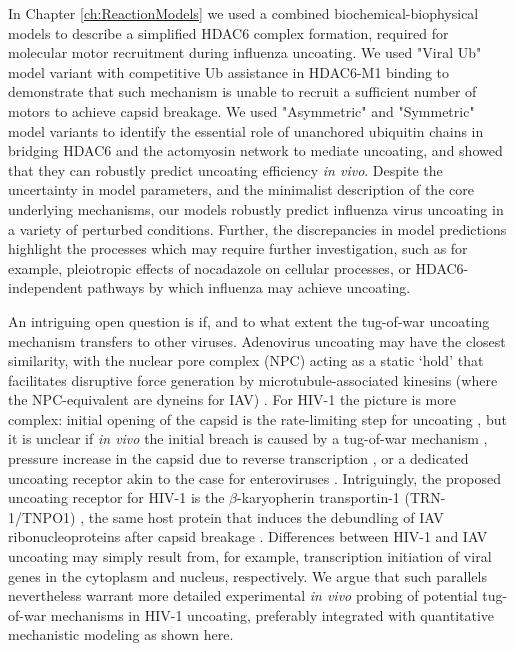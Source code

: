 In Chapter \ref{ch:ReactionModels} we used a combined biochemical-biophysical models to describe a simplified HDAC6 complex formation, required for molecular motor recruitment during influenza uncoating. We used "Viral Ub" model variant with competitive Ub assistance in HDAC6-M1 binding to demonstrate that such mechanism is unable to recruit a sufficient number of motors to achieve capsid breakage. We used "Asymmetric" and "Symmetric" model variants to identify the essential role of unanchored ubiquitin chains in bridging HDAC6 and the actomyosin network to mediate uncoating, and showed that they can robustly predict uncoating efficiency \textit{in vivo}. Despite the uncertainty in model parameters, and the minimalist description of the core underlying mechanisms, our models robustly predict influenza virus uncoating in a variety of perturbed conditions. Further, the discrepancies in model predictions highlight the processes which may require further investigation, such as for example, pleiotropic effects of nocadazole on cellular processes, or HDAC6-independent pathways by which influenza may achieve uncoating. 

An intriguing open question is if, and to what extent the tug-of-war uncoating mechanism transfers to other viruses. Adenovirus uncoating may have the closest similarity, with the nuclear pore complex (NPC) acting as a static ‘hold’ that facilitates disruptive force generation by microtubule-associated kinesins (where the NPC-equivalent are dyneins for IAV) \cite{flatt2019adenovirus, greber2019adenovirus}. For HIV-1 the picture is more complex: initial opening of the capsid is the rate-limiting step for uncoating \cite{marquez2018kinetics}, but it is unclear if \textit{in vivo} the initial breach is caused by a tug-of-war mechanism \cite{rawle2018toward}, pressure increase in the capsid due to reverse transcription \cite{rankovic2017reverse}, or a dedicated uncoating receptor akin to the case for enteroviruses \cite{zhao2019human}. Intriguingly, the proposed uncoating receptor for HIV-1 is the $\beta$-karyopherin transportin-1 (TRN-1/TNPO1) \cite{fernandez2019transportin}, the same host protein that induces the debundling of IAV ribonucleoproteins after capsid breakage \cite{miyake2019influenza, yamauchi2020influenza}. Differences between HIV-1 and IAV uncoating may simply result from, for example, transcription initiation of viral genes in the cytoplasm and nucleus, respectively. We argue that such parallels nevertheless warrant more detailed experimental \textit{in vivo} probing of potential tug-of-war mechanisms in HIV-1 uncoating, preferably integrated with quantitative mechanistic modeling as shown here.

